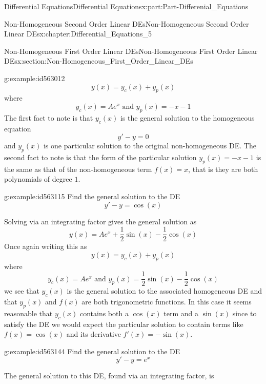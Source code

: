 \documentclass[oneside,10pt,]{book}
\numberwithin{equation}{section}
\begin{document}
\begin{partptx}{Differential Equations}{}{Differential Equations}{}{}{x:part:Part-Differenial_Equations}
\begin{chapterptx}{Non-Homogeneous Second Order Linear DEs}{}{Non-Homogeneous Second Order Linear DEs}{}{}{x:chapter:Differential_Equations_5}
\begin{sectionptx}{Non-Homogeneous First Order Linear DEs}{}{Non-Homogeneous First Order Linear DEs}{}{}{x:section:Non-Homogeneous_First_Order_Linear_DEs}
\begin{example}{}{g:example:id563012}
\begin{equation*}
y(x)=y_c(x)+y_p(x)
\end{equation*}
where%
\begin{equation*}
y_c(x)=Ae^x \textrm{ and } y_p(x)=-x-1
\end{equation*}
The first fact to note is that \(y_c(x)\) is the general solution to the homogeneous equation%
\begin{equation*}
y'-y=0
\end{equation*}
and \(y_p(x)\) is one particular solution to the original non-homogeneous DE. The second fact to note is that the form of the particular solution \(y_p(x)=-x-1\) is the same as that of the non-homogeneous term \(f(x)=x\), that is they are both polynomials of degree \(1\).%
\end{example}
\begin{example}{}{g:example:id563115}%
Find the general solution to the DE%
\begin{equation*}
y'-y=\cos(x)
\end{equation*}
%
\par\smallskip%
\noindent\hypertarget{g:solution:id563110}{}Solving via an integrating factor gives the general solution as%
\begin{equation*}
y(x)=Ae^x+\frac{1}{2}\sin(x)-\frac{1}{2}\cos(x)
\end{equation*}
Once again writing this as%
\begin{equation*}
y(x)=y_c(x)+y_p(x)
\end{equation*}
where%
\begin{equation*}
y_c(x)=Ae^x \textrm{ and } y_p(x)=\frac{1}{2}\sin(x)-\frac{1}{2}\cos(x)
\end{equation*}
we see that \(y_c(x)\) is the general solution to the associated homogeneous DE and that \(y_p(x)\) and \(f(x)\) are both trigonometric functions. In this case it seems reasonable that \(y_c(x)\) contains both a \(\cos(x)\) term and a \(\sin(x)\) since to satisfy the DE we would expect the particular solution to contain terms like \(f(x)=\cos(x)\) and its derivative \(f'(x)=-\sin(x)\).%
\end{example}
\begin{example}{}{g:example:id563144}%
Find the general solution to the DE%
\begin{equation*}
y'-y=e^x
\end{equation*}
%
\par\smallskip%
\noindent\hypertarget{g:solution:id563134}{}The general solution to this DE, found via an integrating factor, is%
\begin{equation*}

\end{equation*}
\end{example}
\end{sectionptx}
\end{chapterptx}
\end{partptx}
\end{document}
